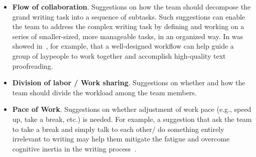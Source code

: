 \begin{itemize}[leftmargin=*]
	\item {\bf Flow of collaboration}. Suggestions on how the team should decompose the grand writing task into a sequence of subtasks. Such suggestions can enable the team to address the complex writing task by defining and working on a series of smaller-sized, more manageable tasks, in an organized way. In was showed in~\cite{bernstein2010soylent}, for example, that a well-designed workflow can help guide a group of laypeople to work together and accomplish high-quality text proofreading. 
	\item {\bf Division of labor / Work sharing}. Suggestions on whether and how the team should divide the workload among the team members. 
	\item {\bf Pace of Work}. Suggestions on whether adjustment of work pace (e.g., speed up, take a break, etc.) is needed. For example, a suggestion that ask the team to take a break and simply talk to each other/ do something entirely irrelevant to writing may help them mitigate the fatigue and overcome cognitive inertia in the writing process~\citep{dai2015and}.


\end{itemize}
